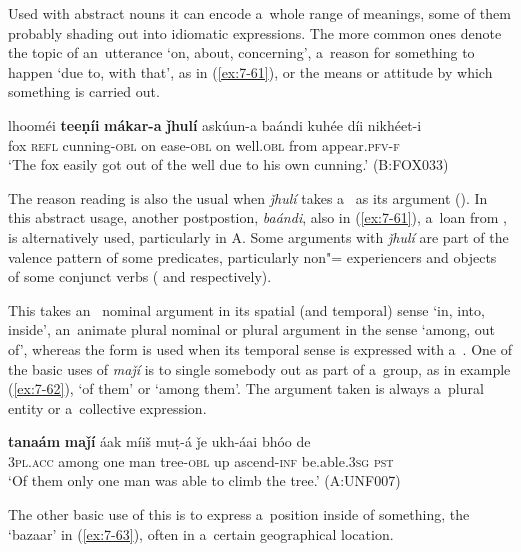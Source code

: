 Used with abstract nouns it can encode a~whole range of meanings, some of them probably shading out into idiomatic expressions. The more common ones denote the topic of an~utterance `on, about, concerning', a~reason for something to happen `due to, with that', as in (\ref{ex:7-61}), or the means or attitude by which something is carried out.

\ea
\label{ex:7-61}
\gll lhooméi \textbf{teeṇíi} \textbf{mákar-a} \textbf{ǰhulí} askúun-a baándi kuhée díi nikhéet-i\\
fox \textsc{refl} cunning-\textsc{obl} on ease-\textsc{obl} on well.\textsc{obl} from appear.\textsc{pfv-f}\\
\glt `The fox easily got out of the well due to his own cunning.' (B:FOX033)
\z

The reason reading is also the usual when \textit{ǰhulí} takes a~ as its argument (). In this abstract usage, another postpostion, \textit{baándi}, also in (\ref{ex:7-61}), a~loan from \iliPashto, is alternatively used, particularly in A. Some arguments with \textit{ǰhulí} are part of the valence pattern of some predicates, particularly non"= experiencers and objects of some conjunct verbs ( and  respectively).


 This  takes an~ nominal argument in its spatial (and temporal) sense `in, into, inside', an~animate  plural nominal or  plural argument in the sense `among, out of', whereas the  form is used when its temporal sense is expressed with a~. One of the basic uses of \textit{maǰí} is to single somebody out as part of a~group, as in example (\ref{ex:7-62}), `of them' or `among them'. The argument taken is always a~plural entity or a~collective expression.

\begin{exe}
\ex
\label{ex:7-62}
\gll \textbf{tanaám} \textbf{maǰí} áak míiš muṭ-á ǰe ukh-áai bhóo de \\
\textsc{3pl.acc} among one man tree-\textsc{obl} up ascend-\textsc{inf}  be.able.\textsc{3sg} \textsc{pst} \\
\glt `Of them only one man was able to climb the tree.' (A:UNF007)
\end{exe}

The other basic use of this  is to express a~position inside of something, the `bazaar' in (\ref{ex:7-63}), often in a~certain geographical location.

